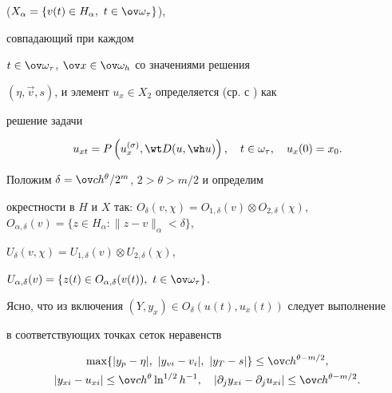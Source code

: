 ($X_\alpha=\{v(t)\in H_\alpha,\ t\in \ov \omega_\tau\}$),


совпадающий при каждом 


$t \in \ov \omega _\tau $, $\ov x \in \ov \omega _h$ со значениями решения 


$(\eta, \Vec v,s)$, и элемент $u_x \in X_2$ определяется (ср. с \cite{F}) как 


решение задачи


\begin{equation}


\label{2}


u_{xt}=P\left(u_x^{(\sigma)},\wt D(u,\wh u)\right),\quad


t\in \omega_\tau,\quad u_x(0)=x_0.


\end{equation}





Положим $\delta=\ov c h^{\theta}/2^m$, $2>\theta>m/2$ и определим 


окрестности в $H$ и $X$ так: $O_\delta(v,\chi)=O_{1,\delta}(v)


\otimes O_{2,\delta}(\chi)$, $O_{\alpha,\delta}(v)=\{z\in 


H_\alpha:\|z-v\|_\alpha<\delta\}$,


$U_\delta(v,\chi)=U_{1,\delta}(v)


\otimes U_{2,\delta}(\chi)$,


$U_{\alpha,\delta}(v)=\{z(t)\in O_{\alpha,\delta}(v(t)),


\ t\in \ov \omega_\tau\}$.





Ясно, что из включения $(Y,y_x) \in O_\delta (u(t),u_x(t))$ следует выполнение 


в соответствующих точках сеток неравенств


\begin{gather}


\max\{ {|y_p-\eta |,\ |y_{vi}-v_i|,\ |y_T-s|}\}\le\ov c h^{\theta-m/2},


\label{31}\\


|y_{xi}-u_{xi}|\le\ov c h^{\theta}\ln^{1/2}h^{-1},\quad


|\partial _j y_{xi}-\partial_j u_{xi} | \le \ov c h^{\theta-m/2}.


\label{32}


\end{gather}


